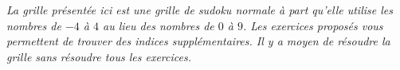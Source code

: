 \documentclass[a4paper,12pt]{book}
\begin{document}
\newpage

\begin{center}
    \emph{La grille présentée ici est une grille de sudoku normale à part qu'elle utilise les nombres de \( -4\) à \( 4\) au lieu des nombres de \( 0\) à \( 9\). Les exercices proposés vous permettent de trouver des indices supplémentaires. Il y a moyen de résoudre la grille sans résoudre tous les exercices.}
\end{center}


\end{document}
